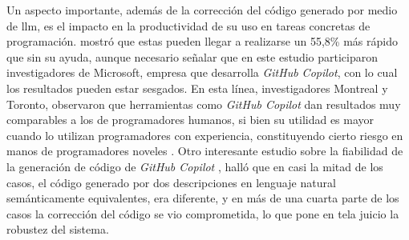 Un aspecto importante, además de la corrección del código generado por medio de \gls{llm}, es el impacto en la productividad de su uso en tareas concretas de programación. \citep{pengImpactAIDeveloper2023a} mostró que estas pueden llegar a realizarse un 55,8\% más rápido que sin su ayuda, aunque necesario señalar que en este estudio participaron investigadores de Microsoft, empresa que desarrolla \emph{GitHub Copilot}, con lo cual los resultados pueden estar sesgados. En esta línea, investigadores Montreal y Toronto, observaron que herramientas como \emph{GitHub Copilot} dan resultados muy comparables a los de programadores humanos, si bien su utilidad es mayor cuando lo utilizan programadores con experiencia, constituyendo cierto riesgo en manos de programadores noveles \citep{moradidakhelGitHubCopilotAI2023}. Otro interesante estudio sobre la fiabilidad de la generación de código de \emph{GitHub Copilot} \citep{mastropaoloRobustnessCodeGeneration2023}, halló que en casi la mitad de los casos, el código generado por dos descripciones en lenguaje natural semánticamente equivalentes, era diferente, y en más de una cuarta parte de los casos la corrección del código se vio comprometida, lo que pone en tela juicio la robustez del sistema.


